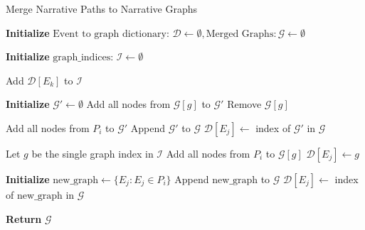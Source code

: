 \begin{algorithm}
\caption{Merge Narrative Paths to Narrative Graphs}
\begin{algorithmic}[1]
\State \textbf{Initialize} \( \text{Event to graph dictionary: } \mathcal{D} \leftarrow \emptyset, \text{Merged Graphs}: \mathcal{G} \leftarrow \emptyset \)

    \State \textbf{Initialize} \( \text{graph\_indices: } \mathcal{I} \leftarrow \emptyset \)

                \State Add \( \mathcal{D}[E_k] \) to \( \mathcal{I} \)
            \EndIf
        \EndFor
    \EndFor

        \State \textbf{Initialize} \( \mathcal{G'} \leftarrow \emptyset \)
            \State Add all nodes from \( \mathcal{G}[g] \) to \( \mathcal{G'} \)
            \State Remove \( \mathcal{G}[g] \)
        \EndFor

        \State Add all nodes from \( P_i \) to \( \mathcal{G'} \)
        \State Append \( \mathcal{G'} \) to \( \mathcal{G} \)
            \State \( \mathcal{D}[E_j] \gets \) index of \( \mathcal{G'} \) in \( \mathcal{G} \)
        \EndFor

        \State Let \( g \) be the single graph index in \( \mathcal{I} \)
        \State Add all nodes from \( P_i \) to \( \mathcal{G}[g] \)
            \State \( \mathcal{D}[E_j] \gets g \)
        \EndFor

    \Else
        \State \textbf{Initialize} \( \text{new\_graph} \leftarrow \{E_j : E_j \in P_i\} \)
        \State Append \( \text{new\_graph} \) to \( \mathcal{G} \)
            \State \( \mathcal{D}[E_j] \gets \) index of \( \text{new\_graph} \) in \( \mathcal{G} \)
        \EndFor
    \EndIf
    
\EndFor

\State \textbf{Return} \( \mathcal{G} \)
\end{algorithmic}
\end{algorithm}

